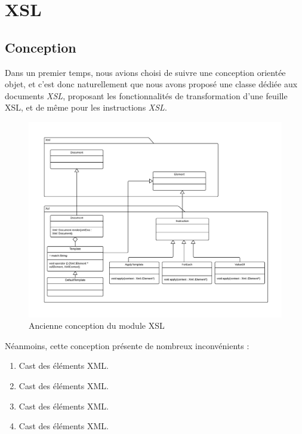 \chapter{XSL}

\section{Conception}

Dans un premier temps, nous avions choisi de suivre une conception orientée objet, et c'est donc
naturellement que nous avons proposé une classe dédiée aux documents \textit{XSL}, proposant les
fonctionnalités de transformation d'une feuille XSL, et de même pour les instructions \textit{XSL}.

\begin{figure}[h!]
    \centering
    \includegraphics[width=\linewidth]{images/xsl-uml-old.pdf}
    \caption{Ancienne conception du module XSL}
    \label{oldXslClassDiagram}
\end{figure}

Néanmoins, cette conception présente de nombreux inconvénients :

\begin{enumerate}
    \item Cast des éléments XML.
    \item Cast des éléments XML.
    \item Cast des éléments XML.
    \item Cast des éléments XML.
\end{enumerate}

